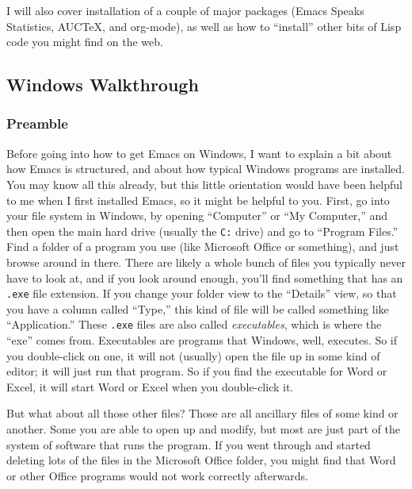 \documentclass{article}
\begin{document}
I will also cover installation of a couple of major packages (Emacs Speaks Statistics, AUCTeX, and org-mode), as well as how to ``install'' other bits of Lisp code you might find on the web.
\subsection{Windows Walkthrough}
\label{sec-3-2}
\subsubsection{Preamble}
\label{sec-3-2-1}

Before going into how to get Emacs on Windows, I want to explain a bit about how Emacs is structured, and about how typical Windows programs are installed. You may know all this already, but this little orientation would have been helpful to me when I first installed Emacs, so it might be helpful to you.  First, go into your file system in Windows, by opening ``Computer'' or ``My Computer,'' and then open the main hard drive (usually the \texttt{C:} drive) and go to ``Program Files.''  Find a folder of a program you use (like Microsoft Office or something), and just browse around in there. There are likely a whole bunch of files you typically never have to look at, and if you look around enough, you'll find something that has an \texttt{.exe} file extension.  If you change your folder view to the ``Details'' view, so that you have a column called ``Type,'' this kind of file will be called something like ``Application.'' These \texttt{.exe} files are also called \emph{executables}, which is where the ``exe'' comes from.  Executables are programs that Windows, well, executes.  So if you double-click on one, it will not (usually) open the file up in some kind of editor; it will just run that program.  So if you find the executable for Word or Excel, it will start Word or Excel when you double-click it.

But what about all those other files?  Those are all ancillary files of some kind or another.  Some you are able to open up and modify, but most are just part of the system of software that runs the program. If you went through and started deleting lots of the files in the Microsoft Office folder, you might find that Word or other Office programs would not work correctly afterwards.
\end{document}
